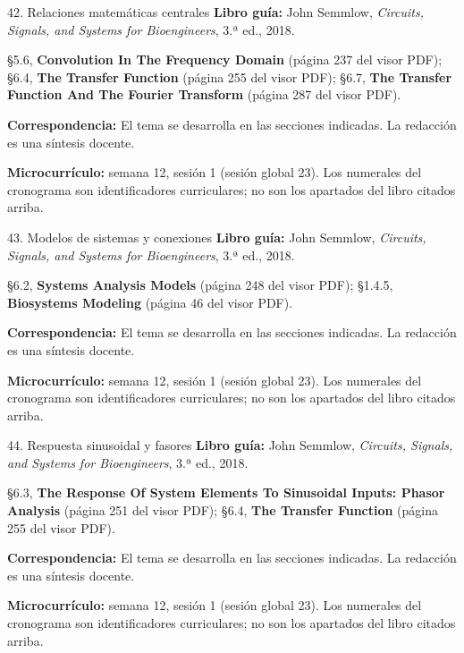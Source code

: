 \documentclass[
  10pt,
  ignorenonframetext,
  aspectratio=169,
  spanish,
]{beamer}
\begin{document}
\begin{frame}{42. Relaciones matemáticas centrales}
\label{relaciones-matemuxe1ticas-centrales-2}
\textbf{Libro guía:} John Semmlow, \emph{Circuits, Signals, and Systems
for Bioengineers}, 3.ª ed., 2018.

§5.6, \textbf{Convolution In The Frequency Domain} (página 237 del visor
PDF); §6.4, \textbf{The Transfer Function} (página 255 del visor PDF);
§6.7, \textbf{The Transfer Function And The Fourier Transform} (página
287 del visor PDF).

\textbf{Correspondencia:} El tema se desarrolla en las secciones
indicadas. La redacción es una síntesis docente.

\textbf{Microcurrículo:} semana 12, sesión 1 (sesión global 23). Los
numerales del cronograma son identificadores curriculares; no son los
apartados del libro citados arriba.
\end{frame}

\begin{frame}{43. Modelos de sistemas y conexiones}
\label{modelos-de-sistemas-y-conexiones}
\textbf{Libro guía:} John Semmlow, \emph{Circuits, Signals, and Systems
for Bioengineers}, 3.ª ed., 2018.

§6.2, \textbf{Systems Analysis Models} (página 248 del visor PDF);
§1.4.5, \textbf{Biosystems Modeling} (página 46 del visor PDF).

\textbf{Correspondencia:} El tema se desarrolla en las secciones
indicadas. La redacción es una síntesis docente.

\textbf{Microcurrículo:} semana 12, sesión 1 (sesión global 23). Los
numerales del cronograma son identificadores curriculares; no son los
apartados del libro citados arriba.
\end{frame}

\begin{frame}{44. Respuesta sinusoidal y fasores}
\label{respuesta-sinusoidal-y-fasores}
\textbf{Libro guía:} John Semmlow, \emph{Circuits, Signals, and Systems
for Bioengineers}, 3.ª ed., 2018.

§6.3, \textbf{The Response Of System Elements To Sinusoidal Inputs:
Phasor Analysis} (página 251 del visor PDF); §6.4, \textbf{The Transfer
Function} (página 255 del visor PDF).

\textbf{Correspondencia:} El tema se desarrolla en las secciones
indicadas. La redacción es una síntesis docente.

\textbf{Microcurrículo:} semana 12, sesión 1 (sesión global 23). Los
numerales del cronograma son identificadores curriculares; no son los
apartados del libro citados arriba.
\end{frame}
\end{document}
